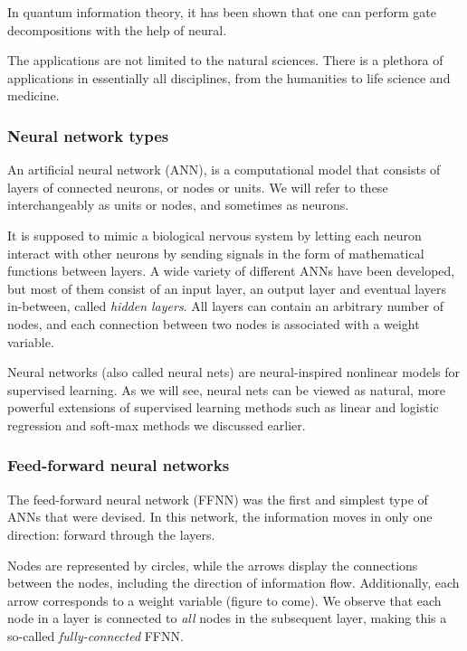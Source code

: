 \documentclass{beamer}
\begin{document}
\begin{frame}
In quantum information theory, it has been shown that one can perform
gate decompositions with the help of neural. 

The applications are not limited to the natural sciences. There is a
plethora of applications in essentially all disciplines, from the
humanities to life science and medicine.
\end{frame}

\begin{frame}
\frametitle{Neural network types}

An artificial neural network (ANN), is a computational model that
consists of layers of connected neurons, or nodes or units.  We will
refer to these interchangeably as units or nodes, and sometimes as
neurons.

It is supposed to mimic a biological nervous system by letting each
neuron interact with other neurons by sending signals in the form of
mathematical functions between layers.  A wide variety of different
ANNs have been developed, but most of them consist of an input layer,
an output layer and eventual layers in-between, called \emph{hidden
layers}. All layers can contain an arbitrary number of nodes, and each
connection between two nodes is associated with a weight variable.

Neural networks (also called neural nets) are neural-inspired
nonlinear models for supervised learning.  As we will see, neural nets
can be viewed as natural, more powerful extensions of supervised
learning methods such as linear and logistic regression and soft-max
methods we discussed earlier.
\end{frame}

\begin{frame}
\frametitle{Feed-forward neural networks}

The feed-forward neural network (FFNN) was the first and simplest type
of ANNs that were devised. In this network, the information moves in
only one direction: forward through the layers.

Nodes are represented by circles, while the arrows display the
connections between the nodes, including the direction of information
flow. Additionally, each arrow corresponds to a weight variable
(figure to come).  We observe that each node in a layer is connected
to \emph{all} nodes in the subsequent layer, making this a so-called
\emph{fully-connected} FFNN.
\end{frame}
\end{document}
